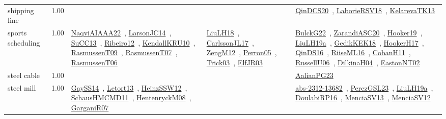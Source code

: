 {\begin{longtable}{p{3cm}r>{\raggedright\arraybackslash}p{6cm}>{\raggedright\arraybackslash}p{6cm}>{\raggedright\arraybackslash}p{8cm}}
\index{shipping line}\index{ApplicationAreas!shipping line}shipping line &  1.00 &  &  & \href{../works/QinDCS20.pdf}{QinDCS20}~\cite{QinDCS20}, \href{../works/LaborieRSV18.pdf}{LaborieRSV18}~\cite{LaborieRSV18}, \href{../works/KelarevaTK13.pdf}{KelarevaTK13}~\cite{KelarevaTK13}\\
\index{sports scheduling}\index{ApplicationAreas!sports scheduling}sports scheduling &  1.00 & \href{../works/NaqviAIAAA22.pdf}{NaqviAIAAA22}~\cite{NaqviAIAAA22}, \href{../works/LarsonJC14.pdf}{LarsonJC14}~\cite{LarsonJC14}, \href{../works/SuCC13.pdf}{SuCC13}~\cite{SuCC13}, \href{../works/Ribeiro12.pdf}{Ribeiro12}~\cite{Ribeiro12}, \href{../works/KendallKRU10.pdf}{KendallKRU10}~\cite{KendallKRU10}, \href{../works/RasmussenT09.pdf}{RasmussenT09}~\cite{RasmussenT09}, \href{../works/RasmussenT07.pdf}{RasmussenT07}~\cite{RasmussenT07}, \href{../works/RasmussenT06.pdf}{RasmussenT06}~\cite{RasmussenT06} & \href{../works/LiuLH18.pdf}{LiuLH18}~\cite{LiuLH18}, \href{../works/CarlssonJL17.pdf}{CarlssonJL17}~\cite{CarlssonJL17}, \href{../works/ZengM12.pdf}{ZengM12}~\cite{ZengM12}, \href{../works/Perron05.pdf}{Perron05}~\cite{Perron05}, \href{../works/Trick03.pdf}{Trick03}~\cite{Trick03}, \href{../works/ElfJR03.pdf}{ElfJR03}~\cite{ElfJR03} & \href{../works/BulckG22.pdf}{BulckG22}~\cite{BulckG22}, \href{../works/ZarandiASC20.pdf}{ZarandiASC20}~\cite{ZarandiASC20}, \href{../works/Hooker19.pdf}{Hooker19}~\cite{Hooker19}, \href{../works/LiuLH19a.pdf}{LiuLH19a}~\cite{LiuLH19a}, \href{../works/GedikKEK18.pdf}{GedikKEK18}~\cite{GedikKEK18}, \href{../works/HookerH17.pdf}{HookerH17}~\cite{HookerH17}, \href{../works/QinDS16.pdf}{QinDS16}~\cite{QinDS16}, \href{../works/RiiseML16.pdf}{RiiseML16}~\cite{RiiseML16}, \href{../works/CobanH11.pdf}{CobanH11}~\cite{CobanH11}, \href{../works/RussellU06.pdf}{RussellU06}~\cite{RussellU06}, \href{../works/DilkinaH04.pdf}{DilkinaH04}~\cite{DilkinaH04}, \href{../works/EastonNT02.pdf}{EastonNT02}~\cite{EastonNT02}\\
\index{steel cable}\index{ApplicationAreas!steel cable}steel cable &  1.00 &  &  & \href{../works/AalianPG23.pdf}{AalianPG23}~\cite{AalianPG23}\\
\index{steel mill}\index{ApplicationAreas!steel mill}steel mill &  1.00 & \href{../works/GaySS14.pdf}{GaySS14}~\cite{GaySS14}, \href{../works/Letort13.pdf}{Letort13}~\cite{Letort13}, \href{../works/HeinzSSW12.pdf}{HeinzSSW12}~\cite{HeinzSSW12}, \href{../works/SchausHMCMD11.pdf}{SchausHMCMD11}~\cite{SchausHMCMD11}, \href{../works/HentenryckM08.pdf}{HentenryckM08}~\cite{HentenryckM08}, \href{../works/GarganiR07.pdf}{GarganiR07}~\cite{GarganiR07} &  & \href{../works/abs-2312-13682.pdf}{abs-2312-13682}~\cite{abs-2312-13682}, \href{../works/PerezGSL23.pdf}{PerezGSL23}~\cite{PerezGSL23}, \href{../works/LiuLH19a.pdf}{LiuLH19a}~\cite{LiuLH19a}, \href{../works/DoulabiRP16.pdf}{DoulabiRP16}~\cite{DoulabiRP16}, \href{../works/MenciaSV13.pdf}{MenciaSV13}~\cite{MenciaSV13}, \href{../works/MenciaSV12.pdf}{MenciaSV12}~\cite{MenciaSV12}\\

\end{longtable}}
